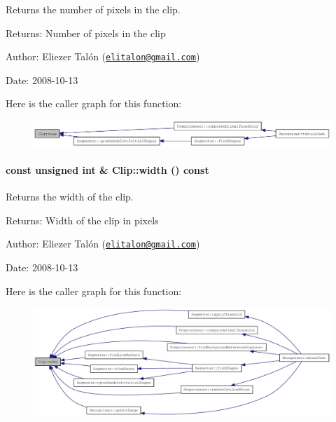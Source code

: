 Returns the number of pixels in the clip. 

\begin{Desc}
\item[Returns:]Number of pixels in the clip\end{Desc}
\begin{Desc}
\item[Author:]Eliezer Talón (\href{mailto:elitalon@gmail.com}{\tt elitalon@gmail.com}) \end{Desc}
\begin{Desc}
\item[Date:]2008-10-13 \end{Desc}


Here is the caller graph for this function:\nopagebreak
\begin{figure}[H]
\begin{center}
\leavevmode
\includegraphics[width=397pt]{class_clip_eb6b12a1a0570b529d6a09633b991fcd_icgraph}
\end{center}
\end{figure}
\hypertarget{class_clip_88d1a47c0ec077e8c6680785509389b0}{
\paragraph[{width}]{\setlength{\rightskip}{0pt plus 5cm}const unsigned int \& Clip::width () const}\hfill}
\label{class_clip_88d1a47c0ec077e8c6680785509389b0}


Returns the width of the clip. 

\begin{Desc}
\item[Returns:]Width of the clip in pixels\end{Desc}
\begin{Desc}
\item[Author:]Eliezer Talón (\href{mailto:elitalon@gmail.com}{\tt elitalon@gmail.com}) \end{Desc}
\begin{Desc}
\item[Date:]2008-10-13 \end{Desc}


Here is the caller graph for this function:\nopagebreak
\begin{figure}[H]
\begin{center}
\leavevmode
\includegraphics[width=420pt]{class_clip_88d1a47c0ec077e8c6680785509389b0_icgraph}
\end{center}
\end{figure}
